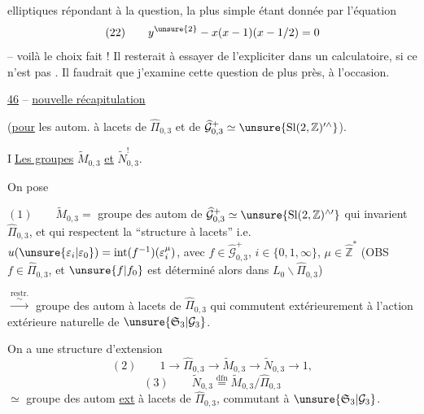 
elliptiques répondant à la question, la plus simple étant donnée par l'équation
\[
(22)\qquad y^{\unsure{2}}-x(x-1)(x-1/2)=0
\]
--  voilà le choix fait ! Il resterait à essayer de l'expliciter  dans un  calculatoire, si ce n'est pas . Il faudrait que j'examine cette  question de plus près, à l'occasion.


\uline{46}\quad \uline{}  -- \uline{nouvelle récapitulation}

(\uline{pour} les autom. à lacets de $\widehat{\Pi}_{0,3}$ et de $\widehat{\mathcal G}_{0,3}^{+}\simeq\unsure{\mathrm{Sl}(2,\mathbb Z)^{\prime\wedge}}$).

\textcircled{I}\quad \uline{Les groupes} $\widetilde M_{0,3}$ \uline{et} $\widetilde N_{0,3}^{!}$.

On pose

$(1)\qquad\widetilde M_{0,3}=$ groupe des autom de $\widehat{\mathcal G}_{0,3}^{+}\simeq\unsure{\mathrm{Sl}(2,\mathbb Z)^{\wedge\prime}}$ qui invarient $\widehat{\Pi}_{0,3}$, et qui respectent la ``structure à lacets'' i.e.  $u(\unsure{\varepsilon_i|\varepsilon_0})=\operatorname{int}(f^{-1})(\varepsilon_i^\mu)$, avec $f\in\widehat{\mathcal G}_{0,3}^{+}$, $i\in\{0,1,\infty\}$, $\mu\in\widehat{\mathbb Z}^{*}$ (OBS $f\in\widehat{\Pi}_{0,3}$, et $\unsure{f|f_0}$ est déterminé alors dans $L_0\backslash\widehat{\Pi}_{0,3}$)

$\overset{\mathrm{restr.}}{\overset{\sim}{\longrightarrow}}$ groupe des autom  à lacets de $\widehat{\Pi}_{0,3}$ qui commutent extérieurement à l'action extérieure naturelle de $\unsure{\mathfrak S_3|\mathcal G_3}$.


On a une structure d'extension
\[
(2)\qquad 1\longrightarrow\widehat{\Pi}_{0,3}\longrightarrow\widetilde M_{0,3}\longrightarrow\widetilde N_{0,3}\longrightarrow1,
\]
 
\[
(3)\qquad\widetilde N_{0,3}\overset{\mathrm{dfn}}{=}\widetilde M_{0,3}/\widehat{\Pi}_{0,3}
\]
$\simeq$ groupe des autom \uline{ext} à lacets de $\widehat{\Pi}_{0,3}$, commutant à $\unsure{\mathfrak S_3|\mathcal G_3}$.

